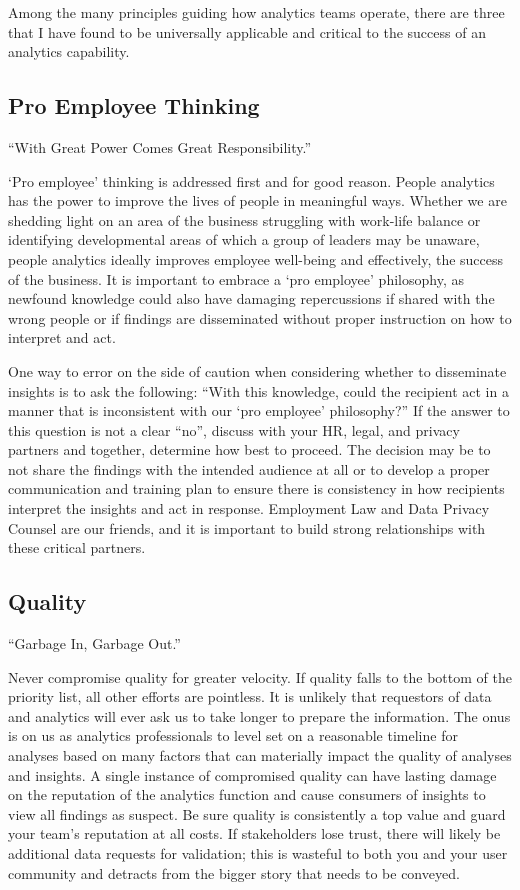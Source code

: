 \documentclass[]{book}
\begin{document}
Among the many principles guiding how analytics teams operate, there are three that I have found to be universally applicable and critical to the success of an analytics capability.

\hypertarget{pro-employee-thinking}{%
\subsection{Pro Employee Thinking}\label{pro-employee-thinking}}

``With Great Power Comes Great Responsibility.''

`Pro employee' thinking is addressed first and for good reason. People analytics has the power to improve the lives of people in meaningful ways. Whether we are shedding light on an area of the business struggling with work-life balance or identifying developmental areas of which a group of leaders may be unaware, people analytics ideally improves employee well-being and effectively, the success of the business. It is important to embrace a `pro employee' philosophy, as newfound knowledge could also have damaging repercussions if shared with the wrong people or if findings are disseminated without proper instruction on how to interpret and act.

One way to error on the side of caution when considering whether to disseminate insights is to ask the following: ``With this knowledge, could the recipient act in a manner that is inconsistent with our `pro employee' philosophy?'' If the answer to this question is not a clear ``no'', discuss with your HR, legal, and privacy partners and together, determine how best to proceed. The decision may be to not share the findings with the intended audience at all or to develop a proper communication and training plan to ensure there is consistency in how recipients interpret the insights and act in response. Employment Law and Data Privacy Counsel are our friends, and it is important to build strong relationships with these critical partners.

\hypertarget{quality}{%
\subsection{Quality}\label{quality}}

``Garbage In, Garbage Out.''

Never compromise quality for greater velocity. If quality falls to the bottom of the priority list, all other efforts are pointless. It is unlikely that requestors of data and analytics will ever ask us to take longer to prepare the information. The onus is on us as analytics professionals to level set on a reasonable timeline for analyses based on many factors that can materially impact the quality of analyses and insights. A single instance of compromised quality can have lasting damage on the reputation of the analytics function and cause consumers of insights to view all findings as suspect. Be sure quality is consistently a top value and guard your team's reputation at all costs. If stakeholders lose trust, there will likely be additional data requests for validation; this is wasteful to both you and your user community and detracts from the bigger story that needs to be conveyed.
\end{document}
